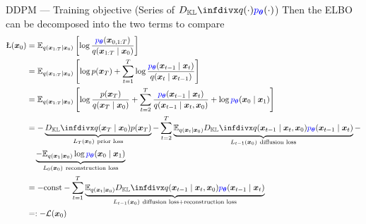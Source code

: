 \documentclass[10pt]{beamer}
\begin{document}
\begin{frame}{DDPM --- \normalsize Training objective (Series of $\infdiv{q(\cdot)}{\textcolor{blue}{p_{\bm{\theta}}}(\cdot)}$)}
    Then the ELBO can be decomposed into the two terms to compare
    {\footnotesize\begin{align*}
        \text{\L}(\bm{x}_0) 
        & = \mathbb{E}_{q(\bm{x}_{1:T}\mid \bm{x}_0)} \left[
            \log \frac{\textcolor{blue}{p_{\bm{\theta}}}(\bm{x}_{0,1:T})}{q(\bm{x}_{1:T}\mid \bm{x}_0)}
        \right] \\
        & = \mathbb{E}_{q(\bm{x}_{1:T}\mid \bm{x}_0)}\left[
        \log p(\bm{x}_T) + \sum_{t=1}^T\log\frac{\textcolor{blue}{p_{\bm{\theta}}}(\bm{x}_{t-1}\mid \bm{x}_t)}{q(\bm{x}_t\mid \bm{x}_{t-1})}
    \right] \\
        & = \mathbb{E}_{q(\bm{x}_{1:T}\mid\bm{x}_0)} \left[
            \log\frac{p(\bm{x}_T)}{q(\bm{x}_T\mid \bm{x}_0)} 
            + \sum_{t=2}^T\frac{\textcolor{blue}{p_{\bm{\theta}}}(\bm{x}_{t-1}\mid \bm{x}_t)}{q(\bm{x}_{t-1}\mid\bm{x}_t,\bm{x}_0)}
            + \log \textcolor{blue}{p_{\bm{\theta}}}(\bm{x}_{0}\mid \bm{x}_1)
        \right]  \\
        & = -\underbrace{\infdiv{q(\bm{x}_{T}\mid\bm{x}_0)}{p(\bm{x}_T)}}_{L_T(\bm{x}_0)~\text{prior loss}} 
        - \sum_{t=2}^T \underbrace{\mathbb{E}_{q(\bm{x}_{t}\mid\bm{x}_0)} \infdiv{q(\bm{x}_{t-1}\mid\bm{x}_t,\bm{x}_0)}{\textcolor{blue}{p_{\bm{\theta}}}(\bm{x}_{t-1}\mid \bm{x}_t)}}_{L_{t-1}(\bm{x}_0)~\text{diffusion loss}} - \\
        & \quad \underbrace{- \mathbb{E}_{q(\bm{x}_1\mid\bm{x}_0)}\log \textcolor{blue}{p_{\bm{\theta}}}(\bm{x}_0\mid\bm{x}_1)}_{L_0(\bm{x}_0)~\text{reconstruction loss}} \\
        & = -\text{const} - \sum_{t=1}^T \underbrace{\mathbb{E}_{q(\bm{x}_{t}\mid\bm{x}_0)} \infdiv{q(\bm{x}_{t-1}\mid\bm{x}_t,\bm{x}_0)}{\textcolor{blue}{p_{\bm{\theta}}}(\bm{x}_{t-1}\mid \bm{x}_t)}}_{L_{t-1}(\bm{x}_0)~\text{diffusion loss}+\text{reconstruction loss}} \\
        & =: - \mathcal{L}(\bm{x}_0)
    \end{align*}}
\end{frame}
\end{document}
